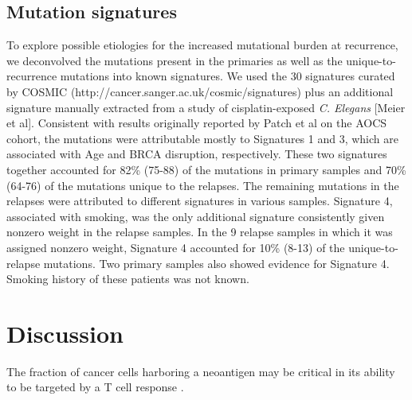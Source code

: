 \subsection*{Mutation signatures}
To explore possible etiologies for the increased mutational burden at recurrence, we deconvolved the mutations present in the primaries as well as the unique-to-recurrence mutations into known signatures. We used the 30 signatures curated by COSMIC (http://cancer.sanger.ac.uk/cosmic/signatures) plus an additional signature manually extracted from a study of cisplatin-exposed \textit{C. Elegans} [Meier et al]. Consistent with results originally reported by Patch et al on the AOCS cohort, the mutations were attributable mostly to Signatures 1 and 3, which are associated with Age and BRCA disruption, respectively. These two signatures together accounted for 82\% (75-88) of the mutations in primary samples and 70\% (64-76) of the mutations unique to the relapses. The remaining mutations in the relapses were attributed to different signatures in various samples. Signature 4, associated with smoking, was the only additional signature consistently given nonzero weight in the relapse samples. In the 9 relapse samples in which it was assigned nonzero weight, Signature 4 accounted for 10\% (8-13) of the unique-to-relapse mutations. Two primary samples also showed evidence for Signature 4. Smoking history of these patients was not known.


\section*{Discussion}

The fraction of cancer cells harboring a neoantigen may be critical in its ability to be targeted by a T cell response \cite{McGranahan_2016}.

\fi

